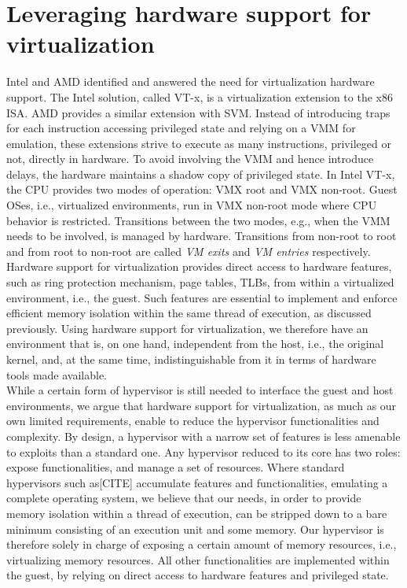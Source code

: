 \documentclass[letterpaper,twocolumn,10pt]{article}
\begin{document}
\section{Leveraging hardware support for virtualization}\label{leverage}
Intel and AMD identified and answered the need for virtualization hardware support.
The Intel solution, called VT-x\cite{DBLP:journals/computer/UhligNRSMABKLS05}, is a virtualization extension to the x86 ISA.
AMD provides a similar extension with SVM\cite{AMD}.
Instead of introducing traps for each instruction accessing privileged state and relying on a VMM for emulation, these extensions strive to execute as many instructions, privileged or not, directly in hardware.
To avoid involving the VMM and hence introduce delays, the hardware maintains a shadow copy of privileged state.
In Intel VT-x, the CPU provides two modes of operation: VMX root and VMX non-root.
Guest OSes, i.e., virtualized environments, run in VMX non-root mode where CPU behavior is restricted.
Transitions between the two modes, e.g., when the VMM needs to be involved, is managed by hardware.
Transitions from non-root to root and from root to non-root are called \emph{VM exits} and \emph{VM entries} respectively. \\

Hardware support for virtualization provides direct access to hardware features, such as ring protection mechanism, page tables, TLBs, from within a virtualized environment, i.e., the guest.
Such features are essential to implement and enforce efficient memory isolation within the same thread of execution, as discussed previously.
Using hardware support for virtualization, we therefore have an environment that is, on one hand, independent from the host, i.e., the original kernel, and, at the same time, indistinguishable from it in terms of hardware tools made available. \\

While a certain form of hypervisor is still needed to interface the guest and host environments, we argue that hardware support for virtualization, as much as our own limited requirements, enable to reduce the hypervisor functionalities and complexity.
By design, a hypervisor with a narrow set of features is less amenable to exploits than a standard one.
Any hypervisor reduced to its core has two roles: expose functionalities, and manage a set of resources.
Where standard hypervisors such as[CITE] accumulate features and functionalities, emulating a complete operating system, we believe that our needs, in order to provide memory isolation within a thread of execution, can be stripped down to a bare minimum consisting of an execution unit and some memory.
Our hypervisor is therefore solely in charge of exposing a certain amount of memory resources, i.e., virtualizing memory resources.
All other functionalities are implemented within the guest, by relying on direct access to hardware features and privileged state. \\
\end{document}
